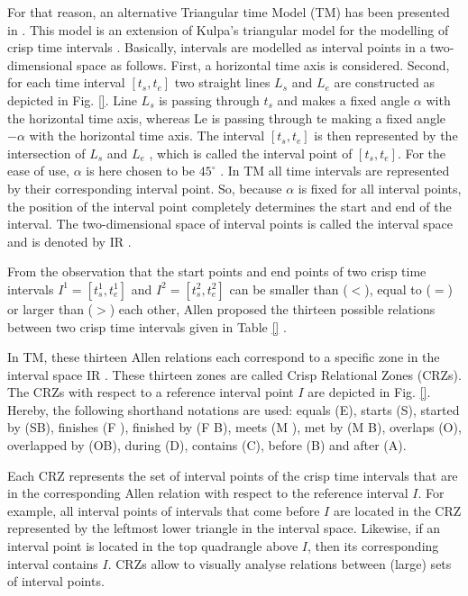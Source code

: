 For that reason, an alternative Triangular time Model (TM) has been presented in \cite{Weghe2007}. This model is an extension of Kulpa's triangular model for the modelling of crisp time intervals \cite{Kulpa1997}. Basically, intervals are modelled as interval points in a two-dimensional space as follows. First, a horizontal time axis is considered. Second, for each time interval $\left[t_s, t_e \right]$ two straight lines $L_s$ and $L_e$ are constructed as depicted in Fig. \ref{}. Line $L_s$ is passing through $t_s$ and makes a fixed angle $\alpha$ with the horizontal time axis, whereas Le is passing through te making a fixed angle $-\alpha$ with the horizontal time axis. The interval $\left[t_s, t_e \right]$ is then represented by the intersection of $L_s$ and $L_e$ , which is called the interval point of $\left[t_s, t_e \right]$. For the ease of use, $\alpha$ is here chosen to be $45^{\circ}$ . In TM all time intervals are represented by their corresponding interval point. So, because $\alpha$ is fixed for all interval points, the position of the interval point completely determines the start and end of the interval. The two-dimensional space of interval points is called the interval space and is denoted by IR \cite{Kulpa2006}.


From the observation that the start points and end points of two crisp time intervals $I^{1} = \left[t_s^1, t_e^1 \right]$ and $I^2 = \left[t_s^2, t_e^2 \right]$ can be smaller than ($<$), equal to ($=$) or larger than ($>$) each other, Allen proposed the thirteen possible relations between two crisp time intervals given in Table \ref{} \cite{Allen1983}.

In TM, these thirteen Allen relations each correspond to a specific zone in the interval space IR \cite{Kulpa1997}. These thirteen zones are called Crisp Relational Zones (CRZs). The CRZs with respect to a reference interval point $I$ are depicted in Fig. \ref{}. Hereby, the following shorthand notations are used: equals (E), starts (S), started by (SB), finishes (F ), finished by (F B), meets (M ), met by (M B), overlaps (O), overlapped by (OB), during (D), contains (C), before (B) and after (A).

% 

Each CRZ represents the set of interval points of the crisp time intervals that are in the corresponding Allen relation with respect to the reference interval $I$. For example, all interval points of intervals that come before $I$ are located in the CRZ represented by the leftmost lower triangle in the interval space. Likewise, if an interval point is located in the top quadrangle above $I$, then its corresponding interval contains $I$. CRZs allow to visually analyse relations between (large) sets of interval points.